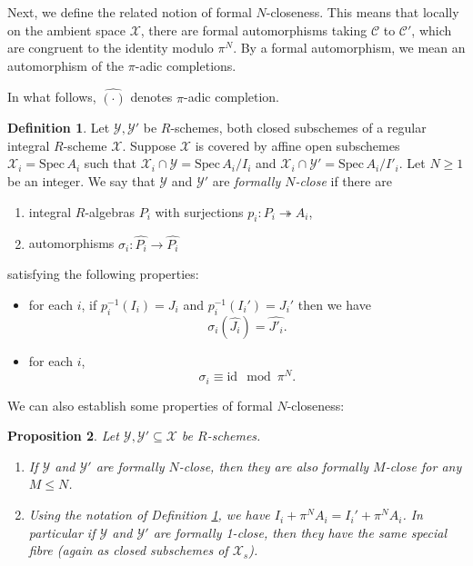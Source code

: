 \documentclass{article}
\theoremstyle{definition}
\newtheorem{defn}{Definition}[section]
\theoremstyle{plain}
\newtheorem{prop}[defn]{Proposition}
\theoremstyle{remark}
\newcommand{\spec}{\mathrm{Spec}\,}
\newcommand{\onto}{\twoheadrightarrow}
\newcommand{\id}{\mathrm{id}}
\newcommand{\comp}[1]{\widehat{#1}}
\begin{document}
	
	Next, we define the related notion of formal $N$-closeness. This means that locally on the ambient space $\mathcal{X}$, there are formal automorphisms taking $\mathcal{C}$ to $\mathcal{C}'$, which are congruent to the identity modulo $\pi^{N}$. By a formal automorphism, we mean an automorphism of the $\pi$-adic completions.
	
	In what follows, $\comp{(\cdot)}$ denotes $\pi$-adic completion.
	\begin{defn}\label{formal_N-closeness}
		Let $\mathcal{Y},\mathcal{Y}'$ be $R$-schemes, both closed subschemes of a regular integral $R$-scheme $\mathcal{X}$. Suppose $\mathcal{X}$ is covered by affine open subschemes $\mathcal{X}_i = \spec A_i$ such that $\mathcal{X}_i\cap \mathcal{Y} = \spec A_i/I_i$ and $\mathcal{X}_i\cap \mathcal{Y}' = \spec A_i/I'_i$. Let $N\ge 1$ be an integer. We say that $\mathcal{Y}$ and $\mathcal{Y}'$ are \emph{formally $N$-close} if there are
		\begin{enumerate}
			\item integral $R$-algebras $P_i$ with surjections $p_i:P_i\onto A_i$,
			\item automorphisms $\sigma_i: \comp{P_i}\to \comp{P_i}$ 
		\end{enumerate}
		satisfying the following properties:
		\begin{itemize}
			\item for each $i$, if $p_i^{-1}(I_i) = J_i$ and $p_i^{-1}(I_i') = J_i'$ then we have
			\[\sigma_i(\comp{J_i}) = \comp{J'_i}.\]
			\item for each $i$, 
			\[\sigma_i \equiv \id \mod \pi^{N}.\]
		\end{itemize}
	\end{defn}
	We can also establish some properties of formal $N$-closeness:
	\begin{prop}\label{formal_closeness_properties}
		Let $\mathcal{Y}, \mathcal{Y}'\subseteq \mathcal{X}$ be $R$-schemes.
		\begin{enumerate}
			\item If $\mathcal{Y}$ and $\mathcal{Y}'$ are formally $N$-close, then they are also formally $M$-close for any $M\le N$.
			\item Using the notation of Definition \ref{formal_N-closeness}, we have $I_i + \pi^NA_i = I_i'+\pi^NA_i$. In particular if $\mathcal{Y}$ and $\mathcal{Y}'$ are formally 1-close, then they have the same special fibre (again as closed subschemes of $\mathcal{X}_s$).
		\end{enumerate}
	\end{prop}
\end{document}
